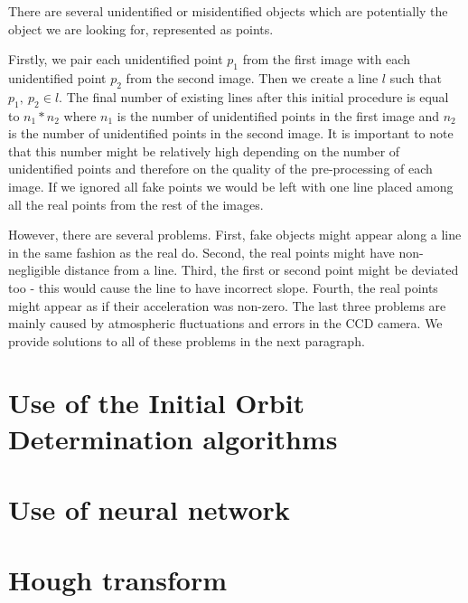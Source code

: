 	There are several unidentified or misidentified objects which are potentially the object we are looking for, represented as points. 
	
	Firstly, we pair each unidentified point $p_1$ from the first image with each unidentified point $p_2$ from the second image. Then we create a line $l$ such that $p_1,\ p_2 \in l$. The final number of existing lines after this initial procedure is equal to $n_1 * n_2$ where $n_1$ is the number of unidentified points in the first image and $n_2$ is the number of unidentified points in the second image. It is important to note that this number might be relatively high depending on the number of unidentified points and therefore on the quality of the pre-processing of each image. If we ignored all fake points we would be left with one line placed among all the real points from the rest of the images.
	
	However, there are several problems. First, fake objects might appear along a line in the same fashion as the real do. Second, the real points might have non-negligible distance from a line. Third, the first or second point might be deviated too - this would cause the line to have incorrect slope. Fourth, the real points might appear as if their acceleration was non-zero. The last three problems are mainly caused by atmospheric fluctuations and errors in the CCD camera. We provide solutions to all of these problems in the next paragraph.
	
	

\section{Use of the Initial Orbit Determination algorithms}\label{sec:IDO}

\section{Use of neural network}\label{sec:neural}

\section{Hough transform}\label{sec:hough}